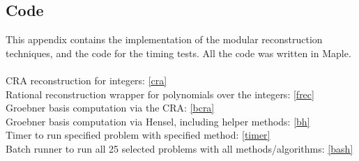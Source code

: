 \documentclass[letterpaper,12pt,titlepage,oneside,final]{book}
\begin{document}
\begin{appendices}
\chapter{Code}\label{elCode}

\noindent This appendix contains the implementation of the modular reconstruction techniques, and the code for the timing tests.  All the code was written in Maple.
\\\\
\noindent CRA reconstruction for integers: \hfill \ref{cra}\\
Rational reconstruction wrapper for polynomials over the integers: \hfill \ref{frec}\\
Groebner basis computation via the CRA: \hfill \ref{bcra}\\
Groebner basis computation via Hensel, including helper methods: \hfill \ref{bh}\\
Timer to run specified problem with specified method: \hfill \ref{timer}\\
Batch runner to run all 25 selected problems with all methods/algorithms: \hfill \ref{bash}\\

\newpage 
\singlespacing

\doublespacing

\singlespacing

\doublespacing

\singlespacing

\doublespacing

\singlespacing

\doublespacing

\singlespacing

\doublespacing

\singlespacing

\doublespacing


\end{appendices}
\end{document}
